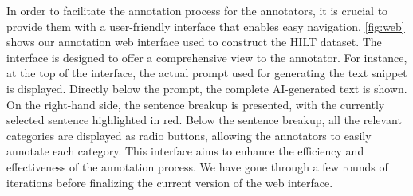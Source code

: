 In order to facilitate the annotation process for the annotators, it is crucial to provide them with a user-friendly interface that enables easy navigation. \cref{fig:web} shows our annotation web interface used to construct the HILT dataset. The interface is designed to offer a comprehensive view to the annotator. For instance, at the top of the interface, the actual prompt used for generating the text snippet is displayed. Directly below the prompt, the complete AI-generated text is shown. On the right-hand side, the sentence breakup is presented, with the currently selected sentence highlighted in red. Below the sentence breakup, all the relevant categories are displayed as radio buttons, allowing the annotators to easily annotate each category. This interface aims to enhance the efficiency and effectiveness of the annotation process. We have gone through a few rounds of iterations before finalizing the current version of the web interface. 


